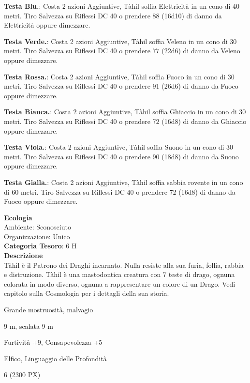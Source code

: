\begin{multicols}{2}
{\textbf{Testa Blu.}: Costa 2 azioni Aggiuntive, Tàhil soffia Elettricità in un cono di 40 metri. Tiro Salvezza su Riflessi DC 40 o prendere 88 (16d10) di danno da Elettricità oppure dimezzare.

\textbf{Testa Verde.}: Costa 2 azioni Aggiuntive, Tàhil soffia Veleno in un cono di 30 metri. Tiro Salvezza su Riflessi DC 40 o prendere 77 (22d6) di danno da Veleno oppure dimezzare.

\textbf{Testa Rossa.}: Costa 2 azioni Aggiuntive, Tàhil soffia Fuoco in un cono di 30 metri. Tiro Salvezza su Riflessi DC 40 o prendere 91 (26d6) di danno da Fuoco oppure dimezzare.

\textbf{Testa Bianca.}: Costa 2 azioni Aggiuntive, Tàhil soffia Ghiaccio in un cono di 30 metri. Tiro Salvezza su Riflessi DC 40 o prendere 72 (16d8) di danno da Ghiaccio oppure dimezzare.

\textbf{Testa Viola.}: Costa 2 azioni Aggiuntive, Tàhil soffia Suono in un cono di 30 metri. Tiro Salvezza su Riflessi DC 40 o prendere 90 (18d8) di danno da Suono oppure dimezzare.

\textbf{Testa Gialla.}: Costa 2 azioni Aggiuntive, Tàhil soffia sabbia rovente in un cono di 60 metri. Tiro Salvezza su Riflessi DC 40 o prendere 72 (16d8) di danno da Fuoco oppure dimezzare.

\textbf{Ecologia}\\
Ambiente: Sconosciuto\\
Organizzazione: Unico\\
\textbf{Categoria Tesoro}: 6 H\\
\textbf{Descrizione}\\
Tàhil è il Patrono dei Draghi incarnato. Nulla resiste alla sua furia, follia, rabbia e distruzione. Tàhil è una mastodontica creatura con 7 teste di drago, ognuna colorata in modo diverso, ognuna a rappresentare un colore di un Drago. Vedi capitolo sulla Cosmologia per i dettagli della sua storia.

\begin{description}[noitemsep, topsep=0pt, parsep=0pt, partopsep=0pt, itemsep=1pt, leftmargin=2.35cm,  labelwidth=2.2cm, itemindent=0cm, listparindent=0pt] %
\setlength{\baselineskip}{10pt}
\item[\textbf{Taglia/Tipo}] Grande mostruosità, malvagio
\item[\textbf{Caratt.}] 
\item[\textbf{Punti Ferita}] 
\item[\textbf{Movimento}] 9 m, scalata 9 m
\item[\textbf{Tiri Salvez.}] 
\item[\textbf{Comp.}] Furtività +9, Consapevolezza +5
\item[\textbf{Sensi}] 
\item[\textbf{Linguaggi}] Elfico, Linguaggio delle Profondità
\item[\textbf{Sfida}] 6 (2300 PX)
\end{description}
\smallskip

}
\end{multicols}
